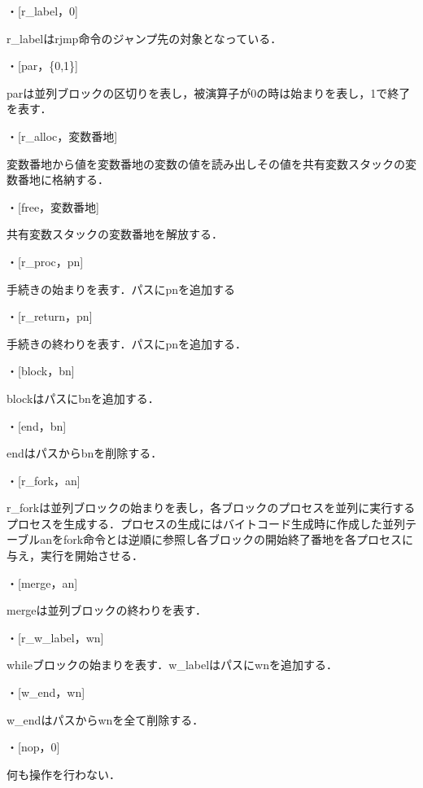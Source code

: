 \documentclass[submit,PRO]{ipsj}
\begin{document}
・[r\_label，0]

r\_labelはrjmp命令のジャンプ先の対象となっている．

・[par，\{0,1\}]

parは並列ブロックの区切りを表し，被演算子が0の時は始まりを表し，1で終了を表す．


・[r\_alloc，変数番地]

変数番地から値を変数番地の変数の値を読み出しその値を共有変数スタックの変数番地に格納する．


・[free，変数番地]

共有変数スタックの変数番地を解放する．

・[r\_proc，pn]

手続きの始まりを表す．パスにpnを追加する

・[r\_return，pn]

手続きの終わりを表す．パスにpnを追加する．

・[block，bn]

blockはパスにbnを追加する．


・[end，bn]

endはパスからbnを削除する．


・[r\_fork，an]

r\_forkは並列ブロックの始まりを表し，各ブロックのプロセスを並列に実行するプロセスを生成する．プロセスの生成にはバイトコード生成時に作成した並列テーブルanをfork命令とは逆順に参照し各ブロックの開始終了番地を各プロセスに与え，実行を開始させる．


・[merge，an]

mergeは並列ブロックの終わりを表す．


・[r\_w\_label，wn]

whileブロックの始まりを表す．w\_labelはパスにwnを追加する．

・[w\_end，wn]

w\_endはパスからwnを全て削除する．


・[nop，0]

何も操作を行わない．
\end{document}
